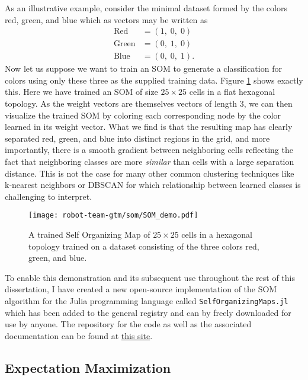 As an illustrative example, consider the minimal dataset formed by the colors red, green, and blue which as vectors may be written as
\begin{align}
  \text{Red} &= \left(1,\; 0,\; 0 \right)\\
  \text{Green} &= \left(0,\; 1,\; 0 \right) \\
  \text{Blue} &= \left(0,\; 0,\; 1 \right).
\end{align}
Now let us suppose we want to train an SOM to generate a classification for colors using only these three as the supplied training data. Figure \ref{fig:som-demo} shows exactly this. Here we have trained an SOM of size $25 \times 25$ cells in a flat hexagonal topology. As the weight vectors are themselves vectors of length $3$, we can then visualize the trained SOM by coloring each corresponding node by the color learned in its weight vector. What we find is that the resulting map has clearly separated red, green, and blue into distinct regions in the grid, and more importantly, there is a smooth gradient between neighboring cells reflecting the fact that neighboring classes are more \textit{similar} than cells with a large separation distance. This is not the case for many other common clustering techniques like k-nearest neighbors or DBSCAN for which relationship between learned classes is challenging to interpret.

\begin{figure}[h!]
  \centering
  \texttt{[image: robot-team-gtm/som/SOM\_demo.pdf]}
  \caption{A trained Self Organizing Map of $25\times 25$ cells in a hexagonal topology trained on a dataset consisting of the three colors red, green, and blue.}
  \label{fig:som-demo}
\end{figure}

To enable this demonstration and its subsequent use throughout the rest of this dissertation, I have created a new open-source implementation of the SOM algorithm for the Julia programming language called \texttt{SelfOrganizingMaps.jl} which has been added to the general registry and can by freely downloaded for use by anyone. The repository for the code as well as the associated documentation can be found at \href{https://github.com/john-waczak/SelfOrganizingMaps.jl}{this site}.


\subsection{Expectation Maximization}

